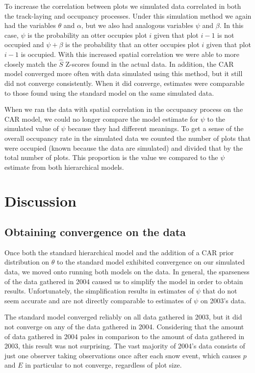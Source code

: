 \documentclass[12pt]{article}
\begin{document}
    To increase the correlation between plots we simulated data
    correlated in both the track-laying and occupancy processes. Under this 
    simulation method we
    again had the variables $\theta$ and $\alpha$, but we also had analogous
    variables $ \psi$ and $\beta$. In this case, $\psi$ is the probability an
    otter occupies plot $i$ given that plot $i-1$ is not occupied and $\psi+
    \beta$ is the probability that an otter occupies plot $i$ given that plot
    $i-1$ is occupied. With this increased spatial correlation we were able to
    more closely match the $\hat{S}$ Z-scores found in the actual data. In
    addition, the CAR model converged more often with data simulated using this
    method, but it still did not converge consistently. When it did converge,
    estimates were comparable to those found using the standard model on the
    same simulated data.

    When we ran the data with spatial correlation in the occupancy process on
    the CAR model, we could no longer compare the model estimate for $\psi$ to
    the simulated value of $\psi$ because they had different meanings. To get a
    sense of the overall occupancy rate in the simulated data we counted the
    number of plots that were occupied (known because the data are simulated)
    and divided that by the total number of plots. This proportion is the value
    we compared to the $\psi$ estimate from both hierarchical models.

\section{Discussion}

    \subsection{Obtaining convergence on the data}
    Once both the standard hierarchical model and the addition of a CAR prior
    distribution on \(\theta\) to the standard model exhibited convergence on
    our simulated data, we moved onto running both models on the data.
    In general, the sparseness of the data gathered in 2004 caused us to
    simplify the model in order to obtain results. Unfortunately, the
    simplification results in estimates of \(\psi\) that do not seem accurate
    and are not directly comparable to estimates of \(\psi\) on 2003's data.

    The standard model converged reliably on all data gathered in 2003, but it
    did not converge on any of the data gathered in 2004. Considering that the
    amount of data gathered in 2004 pales in comparison to the amount of data
    gathered in 2003, this result was not surprising. The vast majority of
    2004's data consists of just one observer taking observations once after
    each snow event, which causes \(p\) and \(E\) in particular to not converge,
    regardless of plot size.
\end{document}
